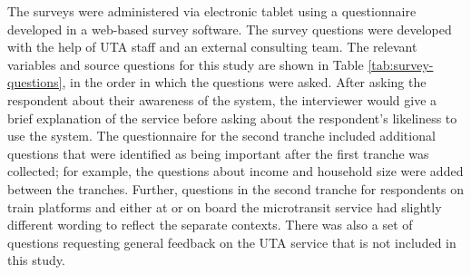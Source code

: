\documentclass[smartcities,article,submit,moreauthors,pdftex]{mdpi}
\begin{document}
The surveys were administered via electronic tablet using a questionnaire
developed in a web-based survey software. The survey questions were developed
with the help of UTA staff and an external consulting team. The relevant
variables and source questions for this study are shown in Table
\ref{tab:survey-questions}, in the order in which the questions were asked. After
asking the respondent about their awareness of the system, the interviewer would
give a brief explanation of the service before asking about the respondent's
likeliness to use the system. The questionnaire for the second tranche included
additional questions that were identified as being important after the first
tranche was collected; for example, the questions about income and household
size were added between the tranches. Further, questions in the second tranche
for respondents on train platforms and either at or on board the microtransit
service had slightly different wording to reflect the separate contexts. There
was also a set of questions requesting general feedback on the UTA service that
is not included in this study.
\end{document}
